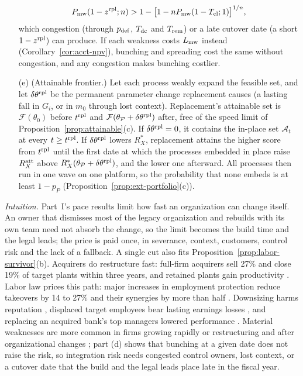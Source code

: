 \begin{proposition}
\begin{enumerate}
\begin{equation}\label{eq:acq-mw}
P_{\rm mw}(1-z^{\rm rpl};n)>1-\bigl[1-nP_{\rm mw}(1-T_{\rm cl};1)\bigr]^{1/n},
\end{equation}
which congestion (through $p_{\rm def}$, $T_{\rm dc}$ and $T_{\rm rem}$) or a late cutover date (a short $1-z^{\rm rpl}$) can produce. If each weakness costs $L_{\rm mw}$ instead (Corollary~\ref{cor:acct-npv}), bunching and spreading cost the same without congestion, and any congestion makes bunching costlier.
\item[(e)] (Attainable frontier.) Let each process weakly expand the feasible set, and let $\delta\theta^{\rm rpl}$ be the permanent parameter change replacement causes (a lasting fall in $G_i$, or in $m_0$ through lost context). Replacement's attainable set is $\mathcal F(\theta_0)$ before $t^{\rm rpl}$ and $\mathcal F(\theta_{\mathcal P}+\delta\theta^{\rm rpl})$ after, free of the speed limit of Proposition~\ref{prop:attainable}(c). If $\delta\theta^{\rm rpl}=0$, it contains the in-place set $\mathcal A_t$ at every $t\ge t^{\rm rpl}$. If $\delta\theta^{\rm rpl}$ lowers $R^*_X$, replacement attains the higher score from $t^{\rm rpl}$ until the first date at which the processes embedded in place raise $R^{\rm att}_X$ above $R^*_X(\theta_{\mathcal P}+\delta\theta^{\rm rpl})$, and the lower one afterward. All processes then run in one wave on one platform, so the probability that none embeds is at least $1-p_P$ (Proposition~\ref{prop:ext-portfolio}(c)).
\end{enumerate}
\end{proposition}

\noindent\emph{Intuition.} Part~I's pace results limit how fast an organization can change itself. An owner that dismisses most of the legacy organization and rebuilds with its own team need not absorb the change, so the limit becomes the build time and the legal leads; the price is paid once, in severance, context, customers, control risk and the lack of a fallback. A single cut also fits Proposition~\ref{prop:labor-survivor}(b). Acquirers do restructure fast: full-firm acquirers sell 27\% and close 19\% of target plants within three years, and retained plants gain productivity \citep{maksimovic2011post}. Labor law prices this path: major increases in employment protection reduce takeovers by 14 to 27\% and their synergies by more than half \citep{dessaint2017employment}. Downsizing harms reputation \citep{love2009character}, displaced target employees bear lasting earnings losses \citep{lagaras2026mas}, and replacing an acquired bank's top managers lowered performance \citep{zollo2004deliberate}. Material weaknesses are more common in firms growing rapidly or restructuring \citep{doyle2007determinants} and after organizational changes \citep{ashbaughskaife2007discovery}; part (d) shows that bunching at a given date does not raise the risk, so integration risk needs congested control owners, lost context, or a cutover date that the build and the legal leads place late in the fiscal year.

